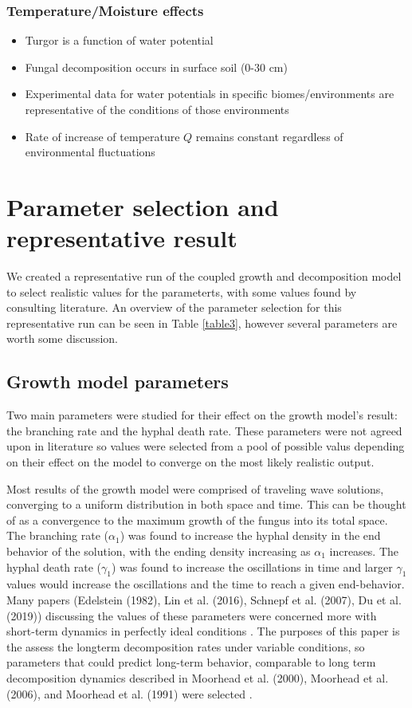 \documentclass[12pt]{article}
\begin{document}
\begin{multicols}{2}
\subsubsection{Temperature/Moisture effects}
\begin{itemize}
	\item Turgor is a function of water potential
	\item Fungal decomposition occurs in surface soil (0-30 cm)
	\item Experimental data for water potentials in specific biomes/environments are representative of the conditions of those environments
	\item Rate of increase of temperature $Q$ remains constant regardless of environmental fluctuations
\end{itemize}

\section{Parameter selection and representative result}
We created a representative run of the coupled growth and decomposition model to select realistic values for the parameterts, with some values found by consulting literature. An overview of the parameter selection for this representative run can be seen in Table \ref{table3}, however several parameters are worth some discussion.
 
\subsection{Growth model parameters}
Two main parameters were studied for their effect on the growth model's result: the branching rate and the hyphal death rate. These parameters were not agreed upon in literature so values were selected from a pool of possible valus depending on their effect on the model to converge on the most likely realistic output. 

Most results of the growth model were comprised of traveling wave solutions, converging to a uniform distribution in both space and time. This can be thought of as a convergence to the maximum growth of the fungus into its total space. The branching rate ($\alpha_{1}$) was found to increase the hyphal density in the end behavior of the solution, with the ending density increasing as $\alpha_{1}$ increases. The hyphal death rate ($\gamma_{1}$) was found to increase the oscillations in time and larger $\gamma_{1}$ values would increase the oscillations and the time to reach a given end-behavior. Many papers (Edelstein (1982), Lin et al. (2016), Schnepf et al. (2007), Du et al. (2019)) discussing the values of these parameters were concerned more with short-term dynamics in perfectly ideal conditions \cite{Edelstein1982, Lin2016, Schnepf2008, Du2019}. The purposes of this paper is the assess the longterm decomposition rates under variable conditions, so parameters that could predict long-term behavior, comparable to long term decomposition dynamics described in Moorhead et al. (2000), Moorhead et al. (2006), and Moorhead et al. (1991) were selected \cite{Moorhead1991, Moorhead2000, Moorhead2006}.


\end{multicols}
\end{document}
